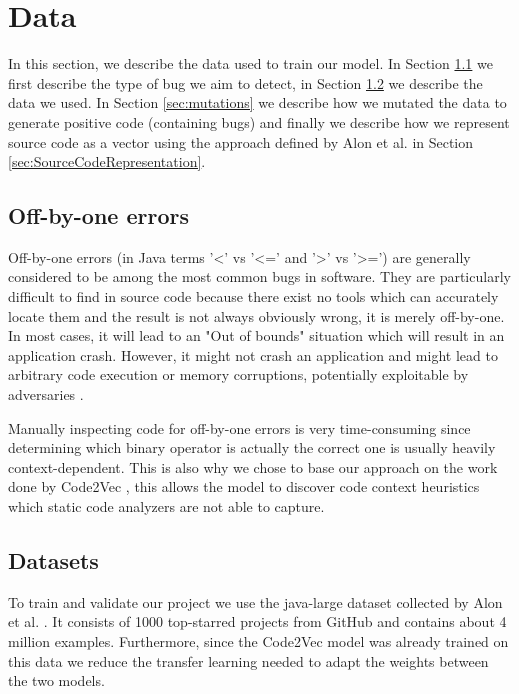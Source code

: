 \section{Data} \label{sec:data}
In this section, we describe the data used to train our model. In Section \ref{sec:obo_errors} we first describe the type of bug we aim to detect, in Section \ref{sec:datasets} we describe the data we used. In Section \ref{sec:mutations} we describe how we mutated the data to generate positive code (containing bugs) and finally we describe how we represent source code as a vector using the approach defined by Alon et al. \cite{alon2019code2vec} in Section \ref{sec:SourceCodeRepresentation}.

\subsection{Off-by-one errors}\label{sec:obo_errors}
Off-by-one errors (in Java terms '<' vs '<=' and '>' vs '>=') are generally considered to be among the most common bugs in software. They are particularly difficult to find in source code because there exist no tools which can accurately locate them and the result is not always obviously wrong, it is merely off-by-one. In most cases, it will lead to an "Out of bounds" situation which will result in an application crash. However, it might not crash an application and might lead to arbitrary code execution or memory corruptions, potentially exploitable by adversaries \cite{dowd2006art}. 

Manually inspecting code for off-by-one errors is very time-consuming since determining which binary operator is actually the correct one is usually heavily context-dependent. This is also why we chose to base our approach on the work done by Code2Vec \cite{alon2019code2vec}, this allows the model to discover code context heuristics which static code analyzers are not able to capture. 

\subsection{Datasets}\label{sec:datasets}

To train and validate our project we use the java-large dataset collected by Alon et al. \cite{code2seq}. It consists of 1000 top-starred projects from GitHub and contains about 4 million examples. Furthermore, since the Code2Vec model was already trained on this data we reduce the transfer learning needed to adapt the weights between the two models. 

